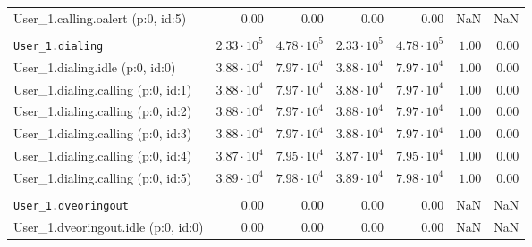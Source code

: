\begin{table}[htbp]
{\begin{tabular}{lrrrrrr}
\hspace{3mm}User\_1.calling.oalert (p:0, id:5)       &              $0.00$ &              $0.00$ &              $0.00$ &              $0.00$ &                  NaN &                  NaN \\
\\[-8pt]\texttt{User\_1.dialing}                     & $2.33 \cdot 10^{5}$ & $4.78 \cdot 10^{5}$ & $2.33 \cdot 10^{5}$ & $4.78 \cdot 10^{5}$ &               $1.00$ &               $0.00$ \\
\hspace{3mm}User\_1.dialing.idle (p:0, id:0)         & $3.88 \cdot 10^{4}$ & $7.97 \cdot 10^{4}$ & $3.88 \cdot 10^{4}$ & $7.97 \cdot 10^{4}$ &               $1.00$ &               $0.00$ \\
\hspace{3mm}User\_1.dialing.calling (p:0, id:1)      & $3.88 \cdot 10^{4}$ & $7.97 \cdot 10^{4}$ & $3.88 \cdot 10^{4}$ & $7.97 \cdot 10^{4}$ &               $1.00$ &               $0.00$ \\
\hspace{3mm}User\_1.dialing.calling (p:0, id:2)      & $3.88 \cdot 10^{4}$ & $7.97 \cdot 10^{4}$ & $3.88 \cdot 10^{4}$ & $7.97 \cdot 10^{4}$ &               $1.00$ &               $0.00$ \\
\hspace{3mm}User\_1.dialing.calling (p:0, id:3)      & $3.88 \cdot 10^{4}$ & $7.97 \cdot 10^{4}$ & $3.88 \cdot 10^{4}$ & $7.97 \cdot 10^{4}$ &               $1.00$ &               $0.00$ \\
\hspace{3mm}User\_1.dialing.calling (p:0, id:4)      & $3.87 \cdot 10^{4}$ & $7.95 \cdot 10^{4}$ & $3.87 \cdot 10^{4}$ & $7.95 \cdot 10^{4}$ &               $1.00$ &               $0.00$ \\
\hspace{3mm}User\_1.dialing.calling (p:0, id:5)      & $3.89 \cdot 10^{4}$ & $7.98 \cdot 10^{4}$ & $3.89 \cdot 10^{4}$ & $7.98 \cdot 10^{4}$ &               $1.00$ &               $0.00$ \\
\\[-8pt]\texttt{User\_1.dveoringout}                 &              $0.00$ &              $0.00$ &              $0.00$ &              $0.00$ &                  NaN &                  NaN \\
\hspace{3mm}User\_1.dveoringout.idle (p:0, id:0)     &              $0.00$ &              $0.00$ &              $0.00$ &              $0.00$ &                  NaN &                  NaN \\

\end{tabular}}
\end{table}
